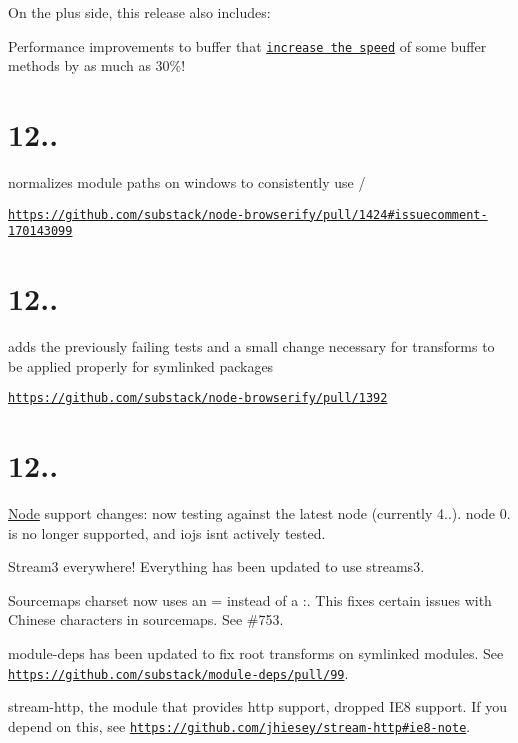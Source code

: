 On the plus side, this release also includes\+:


\begin{DoxyItemize}
\item Performance improvements to {\ttfamily buffer} that \href{https://github.com/feross/buffer/pull/92}{\tt increase the speed} of some buffer methods by as much as 30\%!
\end{DoxyItemize}

\section*{12..}

normalizes module paths on windows to consistently use {\ttfamily /}

\href{https://github.com/substack/node-browserify/pull/1424#issuecomment-170143099}{\tt https\+://github.\+com/substack/node-\/browserify/pull/1424\#issuecomment-\/170143099}

\section*{12..}

adds the previously failing tests and a small change necessary for transforms to be applied properly for symlinked packages

\href{https://github.com/substack/node-browserify/pull/1392}{\tt https\+://github.\+com/substack/node-\/browserify/pull/1392}

\section*{12..}

\mbox{\hyperlink{classNode}{Node}} support changes\+: now testing against the latest node (currently 4..). node 0. is no longer supported, and iojs isn\textquotesingle{}t actively tested.

Stream3 everywhere! Everything has been updated to use streams3.

Sourcemaps charset now uses an {\ttfamily =} instead of a {\ttfamily \+:}. This fixes certain issues with Chinese characters in sourcemaps. See \#753.

module-\/deps has been updated to fix root transforms on symlinked modules. See \href{https://github.com/substack/module-deps/pull/99}{\tt https\+://github.\+com/substack/module-\/deps/pull/99}.

stream-\/http, the module that provides {\ttfamily http} support, dropped I\+E8 support. If you depend on this, see \href{https://github.com/jhiesey/stream-http#ie8-note}{\tt https\+://github.\+com/jhiesey/stream-\/http\#ie8-\/note}.

